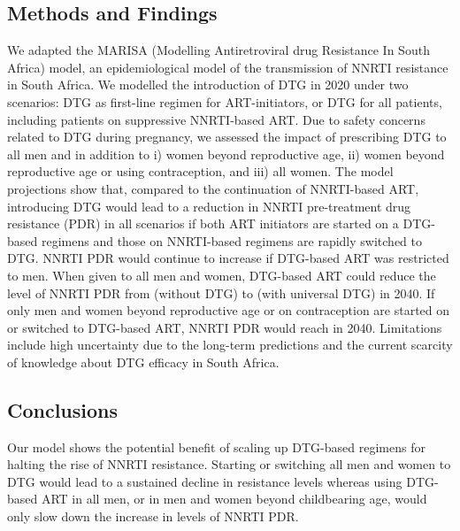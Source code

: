 \documentclass[10pt,letterpaper]{article}
\begin{document}
\subsection*{Methods and Findings}
We adapted the MARISA (Modelling Antiretroviral drug Resistance In South Africa) model, an epidemiological model of the transmission of NNRTI resistance in South Africa. We modelled the introduction of DTG in 2020 under two scenarios: DTG as first-line regimen for ART-initiators, or DTG for all patients, including patients on suppressive NNRTI-based ART. Due to safety concerns related to DTG during pregnancy, we assessed the impact of prescribing DTG to all men and in addition to i) women beyond reproductive age, ii) women beyond reproductive age or using contraception, and iii) all women. The model projections show that, compared to the continuation of NNRTI-based ART, introducing DTG would lead to a reduction in NNRTI pre-treatment drug resistance (PDR) in all scenarios if both ART initiators are started on a DTG-based regimens and those on NNRTI-based regimens are rapidly switched to DTG. NNRTI PDR would continue to increase if DTG-based ART was restricted to men. When given to all men and women, DTG-based ART could reduce the level of NNRTI PDR from \numbera (without DTG) to \numberb (with universal DTG) in 2040. If only men and women beyond reproductive age or on contraception are started on or switched to DTG-based ART, NNRTI PDR would reach \numberc in 2040. Limitations include high uncertainty due to the long-term predictions and the current scarcity of knowledge about DTG efficacy in South Africa.
\subsection*{Conclusions}
Our model shows the potential benefit of scaling up DTG-based regimens for halting the rise of NNRTI resistance. Starting or switching all men and women to DTG would lead to a sustained decline in resistance levels whereas using DTG-based ART in all men, or in men and women beyond childbearing age, would only slow down the increase in levels of NNRTI PDR.
\end{document}
